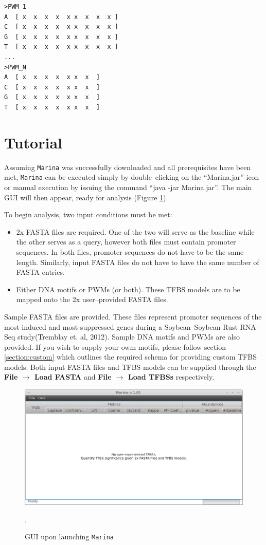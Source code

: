 \documentclass{article}
\begin{document}
\begin{verbatim}
>PWM_1
A  [ x  x  x  x  x x  x  x  x ]
C  [ x  x  x  x  x x  x  x  x ]
G  [ x  x  x  x  x x  x  x  x ]
T  [ x  x  x  x  x x  x  x  x ]
...
>PWM_N
A  [ x  x  x  x  x x  x  ]
C  [ x  x  x  x  x x  x  ]
G  [ x  x  x  x  x x  x  ]
T  [ x  x  x  x  x x  x  ]
\end{verbatim}

\section{Tutorial}
Assuming \texttt{Marina} was successfully downloaded and all prerequisites
have been met, \texttt{Marina} can be executed 
simply by double--clicking on the ``Marina.jar'' icon or manual execution 
by issuing the command ``java -jar Marina.jar''.
The main GUI will then appear, ready for analysis (Figure \ref{fig:mainGUI}).

To begin analysis, two input conditions must be met: 
\begin{itemize}
  \item 2x FASTA files are required. One of the two will serve as the baseline
  	while the other serves as a query, however both files must contain promoter sequences. 
  	In both files, promoter sequences do not have to be the same length. Similarly,
  	input FASTA files do not have to have the same number of FASTA entries. 
  \item Either DNA motifs or PWMs (or both). These TFBS models are to be mapped
  	onto the 2x user--provided FASTA files. 
\end{itemize}
Sample FASTA files are provided. These files represent promoter sequences of the
most-induced and most-suppressed genes during a Soybean--Soybean Rust
RNA--Seq study(Tremblay et. al, 2012). Sample DNA motifs and PWMs are also provided. 
If you wish to supply your owm motifs, please follow section \ref{section:custom} which outlines
the required schema for providing custom TFBS models.
Both input FASTA files and TFBS models can be supplied through the 
\textbf{File $\rightarrow$ Load FASTA} and \textbf{File $\rightarrow$ Load TFBSs} respectively.

\begin{figure}[htbc]
	\centering
	\includegraphics[scale=0.50]{./images/marina_mainGUI.png}
	\caption{GUI upon launching \texttt{Marina}}.
	\label{fig:mainGUI}
\end{figure}
\end{document}
